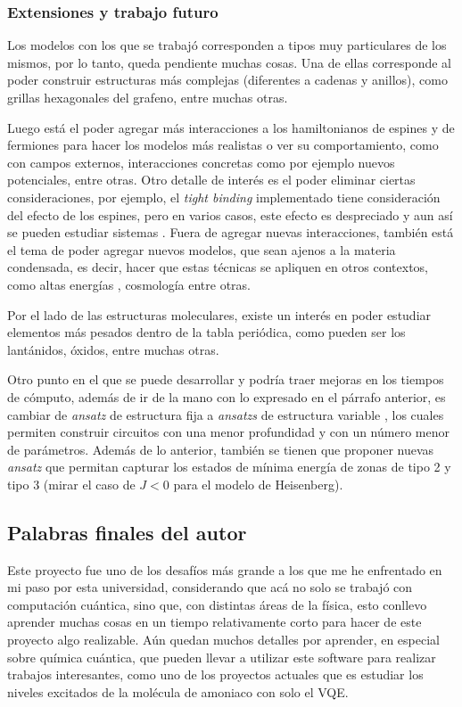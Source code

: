 \subsubsection{Extensiones y trabajo futuro}
Los modelos con los que se trabajó corresponden a tipos muy particulares de los mismos, por lo tanto, queda pendiente muchas cosas. Una de ellas corresponde al poder construir estructuras más complejas (diferentes a cadenas y anillos), como grillas hexagonales del grafeno, entre muchas otras. 

Luego está el poder agregar más interacciones a los hamiltonianos de espines y de fermiones para hacer los modelos más realistas o ver su comportamiento, como con campos externos, interacciones concretas como por ejemplo nuevos potenciales, entre otras. Otro detalle de interés es el poder eliminar ciertas consideraciones, por ejemplo, el \textit{tight binding} implementado tiene consideración del efecto de los espines, pero en varios casos, este efecto es despreciado y aun así se pueden estudiar sistemas \cite{EricBLayer}. Fuera de agregar nuevas interacciones, también está el tema de poder agregar nuevos modelos, que sean ajenos a la materia condensada, es decir, hacer que estas técnicas se apliquen en otros contextos, como altas energías \cite{altasenergias}, cosmología \cite{cosmology} entre otras.

Por el lado de las estructuras moleculares, existe un interés en poder estudiar elementos más pesados dentro de la tabla periódica, como pueden ser los lantánidos, óxidos, entre muchas otras.

Otro punto en el que se puede desarrollar y podría traer mejoras en los tiempos de cómputo, además de ir de la mano con lo expresado en el párrafo anterior, es cambiar de \textit{ansatz} de estructura fija a \textit{ansatzs} de estructura variable \cite{ADAPTVQE}, los cuales permiten construir circuitos con una menor profundidad y con un número menor de parámetros. Además de lo anterior, también se tienen que proponer nuevas \textit{ansatz} que permitan capturar los estados de mínima energía de zonas de tipo 2 y tipo 3 (mirar el caso de $J<0$ para el modelo de Heisenberg).


\subsection{Palabras finales del autor}
Este proyecto fue uno de los desafíos más grande a los que me he enfrentado en mi paso por esta universidad, considerando que acá no solo se trabajó con computación cuántica, sino que, con distintas áreas de la física, esto conllevo aprender muchas cosas en un tiempo relativamente corto para hacer de este proyecto algo realizable. Aún quedan muchos detalles por aprender, en especial sobre química cuántica, que pueden llevar a utilizar este software para realizar trabajos interesantes, como uno de los proyectos actuales que es estudiar los niveles excitados de la molécula de amoniaco con solo el VQE. 

